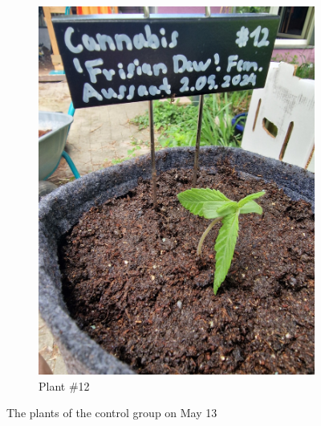 \begin{figure}[htbp]
\begin{subfigure}[t]{.15\textwidth}
        \includegraphics[width=\linewidth]{plant_12_2024-05-13}
        \caption{Plant \#12}
        \label{fig:plant_12_2024-05-13}
    \end{subfigure}
    \caption[Plants of the control group on May 13]{The plants of the control group on May 13}
    \label{fig:plants_ctrl_2024-05-13}
\end{figure}

